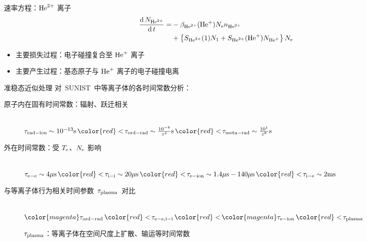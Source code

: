 \begin{CJK*}{UTF8}{kai}
\begin{frame}{速率方程：${\rm He}^{2+}$ 离子}
	\[
	\begin{aligned}
		\frac{{\rm d}\,N_{{\rm He}^{2+}}}{{\rm d}\,t}=
			&-\beta_{{\rm He}^{2+}}({\rm He}^{+})N_{\rm e}n_{{\rm He}^{2+}}\\
			&+\left\{S_{{\rm He}^{2+}}(1)N_1+S_{{\rm He}^{2+}}({\rm He}^+)N_{{\rm He}^+}\right\}N_{\rm e}
	\end{aligned}
	\]
	\begin{itemize}
		\item 主要损失过程：电子碰撞复合至 ${\rm He}^+$ 离子
		\item 主要产生过程：基态原子与 ${\rm He}^+$ 离子的电子碰撞电离
	\end{itemize}
\end{frame}



\begin{frame}{准稳态近似处理}
	对~SUNIST~中等离子体的各时间常数分析：
	\begin{description}
		\item[原子内在固有时间常数：辐射、跃迁相关]
			\quad\\
			\hspace{-3em}
			$\tau_{\rm rad-ion}\sim 10^{-13}{\rm s}\,{\color{red} <}\,
			\tau_{\rm ord-rad}\sim \frac{10^{-8}}{z^4}{\rm s}\,{\color{red} <}\,
			\tau_{\rm meta-rad}\sim \frac{10^{1}}{z^8}{\rm s}$
		\item[外在时间常数：受 $T_{\rm e}$、$N_{\rm e}$ 影响]
			\quad\\
			\hspace{-3em}
			$\tau_{\rm e-e}\sim 4 {\rm \mu s}\,{\color{red} <}\,
            \tau_{\rm i-i}\sim 20 {\rm \mu s}\,{\color{red} <}\,
            \tau_{\rm e-ion}\sim 1.4 {\rm \mu s} - 140 {\rm \mu s}\,{\color{red} <}\,
            \tau_{\rm i-e}\sim 2 {\rm ms}$
		\item[与等离子体行为相关时间参数~$\tau_{\rm{plasma}}$~对比]
			\quad\\
			\hspace{-3em}
			${\color{magenta}\tau_{\rm ord-rad}} \,{\color{red} <}\,
            \tau_{\rm e-e,i-i} \,{\color{red} <}\,
            {\color{magenta}\tau_{\rm e-ion}} \,{\color{red} <}\,
            \tau_{\rm plasma}$%

			$\tau_{\rm{plasma}}$：等离子体在空间尺度上扩散、输运等时间常数
	\end{description}
	

\end{frame}
\end{CJK*}
